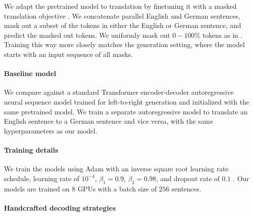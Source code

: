 \documentclass{article}
\begin{document}
We adapt the pretrained model to translation by finetuning it with a masked translation objective \citep{lample2019cross}. We concatenate parallel English and German sentences,
mask out a subset of the tokens in either the English or German sentence, and predict the masked out tokens. We uniformly mask out $0-100\%$ tokens as in \citet{ghazvininejad2019constant}.
Training this way more closely matches the generation setting, where the model starts with an input sequence of all masks.

\paragraph{Baseline model} 

We compare against a standard Transformer encoder-decoder autoregressive neural sequence model \citep{vaswani2017attention} trained for left-to-right generation and initialized with the same pretrained model. %
We train a separate autoregressive model to translate an English sentence to a German sentence and vice versa, with the same hyperparameters as our model. 

\paragraph{Training details}

We train the models using Adam \citep{kingma2014adam} with an inverse square root learning rate schedule, learning rate of $10^{-4}$, $\beta_1 = 0.9$, $\beta_2=0.98$, and dropout rate of $0.1$ \citep{srivastava2014dropout}. 
Our models are trained on $8$ GPUs with a batch size of $256$ sentences. 


\paragraph{Handcrafted decoding strategies}
\end{document}
